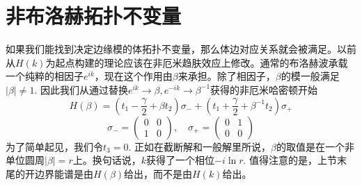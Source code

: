 \documentclass{article}
\begin{document}
\section{非布洛赫拓扑不变量}
如果我们能找到决定边缘模的体拓扑不变量，那么体边对应关系就会被满足。以前从$H(k)$为起点构建的理论应该在非厄米趋肤效应上修改。通常的布洛赫波承载一个纯粹的相因子$e^{ik}$，现在这个作用由$\beta$来承担。除了相因子，$\beta$的模一般满足$|\beta|\neq1$. 因此我们从通过替换$e^{ik}\rightarrow\beta,e^{-ik}\rightarrow\beta^{-1}$获得的非厄米哈密顿开始
\begin{equation}
    H(\beta)=\left(t_1-\frac{\gamma}{2}+\beta t_2\right)\sigma_-+\left(t_1+\frac{\gamma}{2}+\beta^{-1}t_2\right)\sigma_+
\end{equation}
\begin{equation}
    \sigma_-=\begin{pmatrix}
        0&0\\
        1&0
    \end{pmatrix},\quad\sigma_+=\begin{pmatrix}
        0&1\\
        0&0
    \end{pmatrix}
\end{equation}
为了简单起见，我们令$t_3=0$. 正如在截断解和一般解里所说，$\beta$的取值是在一个非单位圆周$|\beta|=r$上。换句话说，$k$获得了一个相位$-i\ln r$. 值得注意的是，上节末尾的开边界能谱是由$H(\beta)$给出，而不是由$H(k)$给出。
\end{document}
